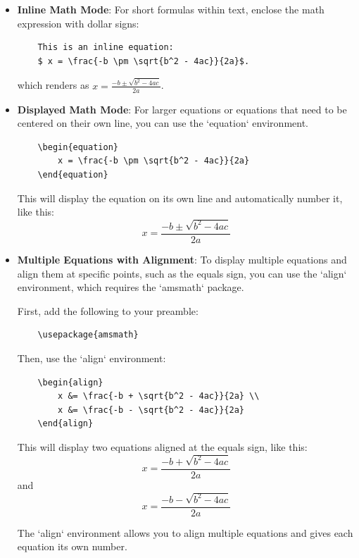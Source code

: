 \begin{itemize}
    \item \textbf{Inline Math Mode}: For short formulas within text, enclose the math expression with dollar signs:
    \begin{verbatim}
    This is an inline equation:
    $ x = \frac{-b \pm \sqrt{b^2 - 4ac}}{2a}$.
    \end{verbatim} 
    which renders as \( x = \frac{-b \pm \sqrt{b^2 - 4ac}}{2a} \).

    \item \textbf{Displayed Math Mode}: For larger equations or equations that need to be centered on their own line, you can use the `equation` environment.

    \begin{verbatim}
    \begin{equation}
        x = \frac{-b \pm \sqrt{b^2 - 4ac}}{2a}
    \end{equation}
    \end{verbatim}

    This will display the equation on its own line and automatically number it, like this:
    \begin{equation}
    x = \frac{-b \pm \sqrt{b^2 - 4ac}}{2a}
    \end{equation}
    
    \item \textbf{Multiple Equations with Alignment}: To display multiple equations and align them at specific points, such as the equals sign, you can use the `align` environment, which requires the `amsmath` package.
    
    First, add the following to your preamble:
    \begin{verbatim}
    \usepackage{amsmath}
    \end{verbatim}
    
    Then, use the `align` environment:
    \begin{verbatim}
    \begin{align}
        x &= \frac{-b + \sqrt{b^2 - 4ac}}{2a} \\
        x &= \frac{-b - \sqrt{b^2 - 4ac}}{2a}
    \end{align}
    \end{verbatim}

    This will display two equations aligned at the equals sign, like this:
    \[
    x = \frac{-b + \sqrt{b^2 - 4ac}}{2a}
    \]
    and
    \[
    x = \frac{-b - \sqrt{b^2 - 4ac}}{2a}
    \]
    
    The `align` environment allows you to align multiple equations and gives each equation its own number.
\end{itemize}




